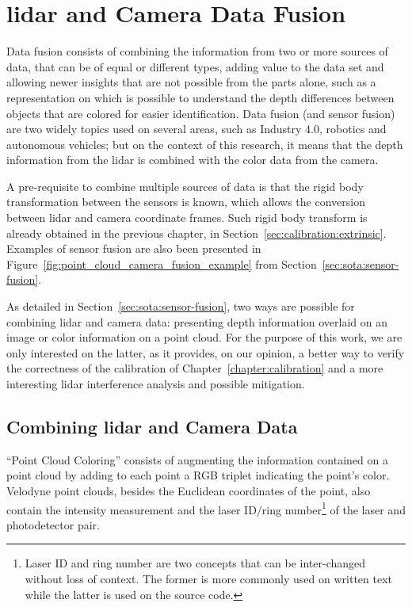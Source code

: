 \chapter{\ac{lidar} and Camera Data Fusion}
\label{chapter:sensor-fusion}

Data fusion consists of combining the information from two or more sources of data, that can be of equal or different types, adding value to the data set and allowing newer insights that are not possible from the parts alone, such as a representation on which is possible to understand the depth differences  between objects that are colored for easier identification. Data fusion (and sensor fusion) are two widely topics used on several areas, such as Industry 4.0, robotics and autonomous vehicles; but on the context of this research, it means that the depth information from the \ac{lidar} is combined with the color data from the camera.

A pre-requisite to combine multiple sources of data is that the rigid body transformation between the sensors is known, which allows the conversion between \ac{lidar} and camera coordinate frames. Such rigid body transform is already obtained in the previous chapter, in Section~\ref{sec:calibration:extrinsic}. Examples of sensor fusion are also been presented in Figure~\ref{fig:point_cloud_camera_fusion_example} from Section~\ref{sec:sota:sensor-fusion}.

As detailed in Section~\ref{sec:sota:sensor-fusion}, two ways are possible for combining \ac{lidar} and camera data: presenting depth information overlaid on an image or color information on a point cloud. For the purpose of this work, we are only interested on the latter, as it provides, on our opinion, a better way to verify the correctness of the calibration of Chapter~\ref{chapter:calibration} and a more interesting \ac{lidar} interference analysis and possible mitigation.

\section{Combining \ac{lidar} and Camera Data}
``Point Cloud Coloring'' consists of augmenting the information contained on a point cloud by adding to each point a RGB triplet indicating the point's color. Velodyne point clouds, besides the Euclidean coordinates of the point, also contain the intensity measurement and the laser ID/ring number\footnote{Laser ID and ring number are two concepts that can be inter-changed without loss of context. The former is more commonly used on written text while the latter is used on the source code.} of the laser and photodetector pair.

